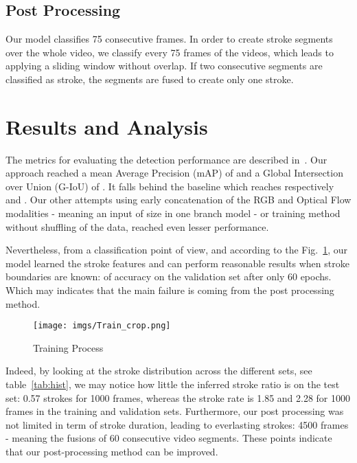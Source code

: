 \documentclass[sigconf]{acmart-me}
\begin{document}
\subsection{Post Processing}

Our model classifies 75 consecutive frames. In order to create stroke segments over the whole video, we classify every 75 frames of the videos, which leads to applying a sliding window without overlap. If two consecutive segments are classified as stroke, the segments are fused to create only one stroke.


\section{Results and Analysis}
\label{sec:res}
The metrics for evaluating the detection performance are described in~\cite{mediaeval/Martin21/task}. Our approach reached a mean Average Precision (mAP) of  and a Global Intersection over Union (G-IoU) of . It falls behind the baseline which reaches respectively  and . Our other attempts using early concatenation of the RGB and Optical Flow modalities - meaning an input of size  in one branch model - or training method without shuffling of the data, reached even lesser performance.

\par

Nevertheless, from a classification point of view, and according to the Fig.~\ref{fig:train}, our model learned the stroke features and can perform reasonable results when stroke boundaries are known:  of accuracy on the validation set after only 60 epochs. Which may indicates that the main failure is coming from the post processing method.

\begin{figure}
 \centering
 \texttt{[image: imgs/Train\_crop.png]}
 \caption{Training Process}
 \label{fig:train}
\end{figure}

Indeed, by looking at the stroke distribution across the different sets, see table~\ref{tab:hist}, we may notice how little the inferred stroke ratio is on the test set: 0.57 strokes for 1000 frames, whereas the stroke rate is 1.85 and 2.28 for 1000 frames in the training and validation sets. Furthermore, our post processing was not limited in term of stroke duration, leading to everlasting strokes: 4500 frames - meaning the fusions of 60 consecutive video segments. These
points indicate that our post-processing method can be improved.
\end{document}
